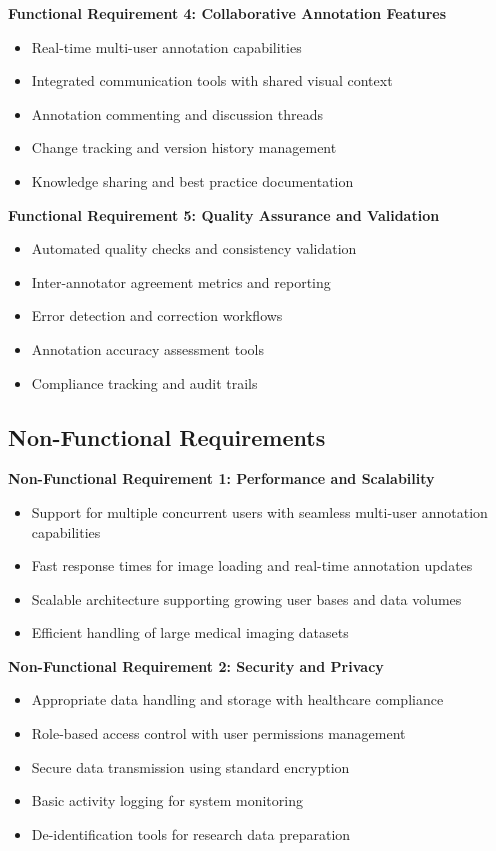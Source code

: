 \textbf{Functional Requirement 4: Collaborative Annotation Features}
\begin{itemize}
    \item Real-time multi-user annotation capabilities
    \item Integrated communication tools with shared visual context
    \item Annotation commenting and discussion threads
    \item Change tracking and version history management
    \item Knowledge sharing and best practice documentation
\end{itemize}

\textbf{Functional Requirement 5: Quality Assurance and Validation}
\begin{itemize}
    \item Automated quality checks and consistency validation
    \item Inter-annotator agreement metrics and reporting
    \item Error detection and correction workflows
    \item Annotation accuracy assessment tools
    \item Compliance tracking and audit trails
\end{itemize}

\subsection{Non-Functional Requirements}

\textbf{Non-Functional Requirement 1: Performance and Scalability}
\begin{itemize}
    \item Support for multiple concurrent users with seamless multi-user annotation capabilities
    \item Fast response times for image loading and real-time annotation updates
    \item Scalable architecture supporting growing user bases and data volumes
    \item Efficient handling of large medical imaging datasets
\end{itemize}

\textbf{Non-Functional Requirement 2: Security and Privacy}
\begin{itemize}
    \item Appropriate data handling and storage with healthcare compliance
    \item Role-based access control with user permissions management
    \item Secure data transmission using standard encryption
    \item Basic activity logging for system monitoring
    \item De-identification tools for research data preparation
\end{itemize}

